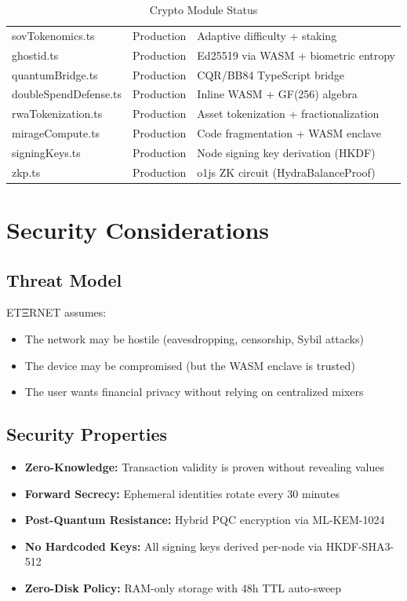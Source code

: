 \documentclass[11pt,a4paper]{article}
\begin{document}
\begin{table}[h]
\begin{tabular}{@{}lll@{}}
sovTokenomics.ts & Production & Adaptive difficulty + staking \\
ghostid.ts & Production & Ed25519 via WASM + biometric entropy \\
quantumBridge.ts & Production & CQR/BB84 TypeScript bridge \\
doubleSpendDefense.ts & Production & Inline WASM + GF(256) algebra \\
rwaTokenization.ts & Production & Asset tokenization + fractionalization \\
mirageCompute.ts & Production & Code fragmentation + WASM enclave \\
signingKeys.ts & Production & Node signing key derivation (HKDF) \\
zkp.ts & Production & o1js ZK circuit (HydraBalanceProof) \\
\bottomrule
\end{tabular}
\caption{Crypto Module Status}
\end{table}

\section{Security Considerations}

\subsection{Threat Model}
ETΞRNET assumes:
\begin{itemize}[nosep]
  \item The network may be hostile (eavesdropping, censorship, Sybil attacks)
  \item The device may be compromised (but the WASM enclave is trusted)
  \item The user wants financial privacy without relying on centralized mixers
\end{itemize}

\subsection{Security Properties}
\begin{itemize}[nosep]
  \item \textbf{Zero-Knowledge:} Transaction validity is proven without revealing values
  \item \textbf{Forward Secrecy:} Ephemeral identities rotate every 30 minutes
  \item \textbf{Post-Quantum Resistance:} Hybrid PQC encryption via ML-KEM-1024
  \item \textbf{No Hardcoded Keys:} All signing keys derived per-node via HKDF-SHA3-512
  \item \textbf{Zero-Disk Policy:} RAM-only storage with 48h TTL auto-sweep
\end{itemize}
\end{document}
